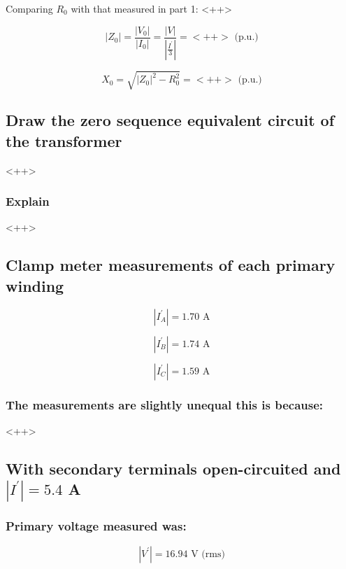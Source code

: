 \documentclass{article}
\begin{document}
Comparing $R_0$ with that measured in part 1: <++>

\begin{equation}
  | Z_0 | = \frac{| V_0 |}{| I_0 |} = \frac{| V |}{| \frac{I^{'}}{3}|} = <++>\text{ (p.u.)}
\end{equation}

\begin{equation}
  X_0 = \sqrt{| Z_0 |^{2} - R^{2}_0} = <++> \text{ (p.u.)}
\end{equation}

\subsection{Draw the zero sequence equivalent circuit of the transformer} 
<++>

\subsubsection{Explain} 
<++>

\subsection{Clamp meter measurements of each primary winding} 

\begin{equation}
  | I^{'}_{A} | = 1.70 \text{ A}
\end{equation}

\begin{equation}
  | I^{'}_{B} | = 1.74 \text{ A}
\end{equation}

\begin{equation}
  | I^{'}_{C} | = 1.59 \text{ A}
\end{equation}

\subsubsection{The measurements are slightly unequal this is because:} 
<++>

\subsection{With secondary terminals open-circuited and $|I^{'}| = 5.4$ A} 

\subsubsection{Primary voltage measured was:}
\begin{equation}
  | V^{'} | = 16.94 \text{ V (rms)}
\end{equation}
\end{document}
